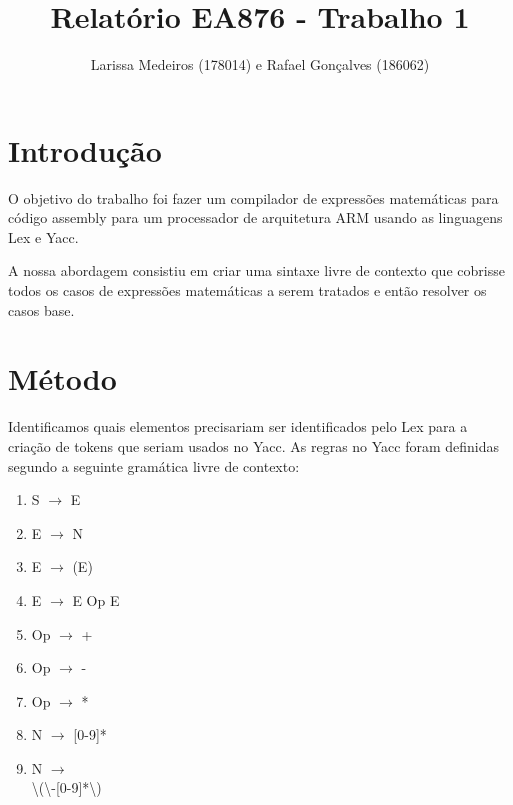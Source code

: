 \documentclass[a4paper, 11pt]{article}
\title{Relatório EA876 - Trabalho 1}
\author{Larissa Medeiros (178014) e Rafael Gonçalves (186062)}
\date{}
\begin{document}
\maketitle
\begin{multicols*}{2}

\section*{Introdução}

O objetivo do trabalho foi fazer um compilador de expressões matemáticas para código assembly para um processador de arquitetura ARM usando as linguagens Lex e Yacc.

A nossa abordagem consistiu em criar uma sintaxe livre de contexto que cobrisse todos os casos de expressões matemáticas a serem tratados e então resolver os casos base.

\section*{Método}

Identificamos quais elementos precisariam ser identificados pelo Lex para a criação de tokens que seriam usados no Yacc. As regras no Yacc foram definidas segundo a seguinte gramática livre de contexto:

\begin{multicols*}{2}
\setlength{\columnsep}{0em}
\begin{enumerate}
\item
S $\rightarrow$ E

\item
E $\rightarrow$ N

\item
E $\rightarrow$ (E)

\item
E $\rightarrow$ E Op E

\item
Op $\rightarrow$ +

\item
Op $\rightarrow$ -

\item
Op $\rightarrow$ *

\item
N $\rightarrow$ [0-9]*

\item
N $\rightarrow$ \\ \textbackslash(\textbackslash-[0-9]*\textbackslash)

\end{enumerate}


\end{multicols*}
\end{multicols*}
\end{document}
